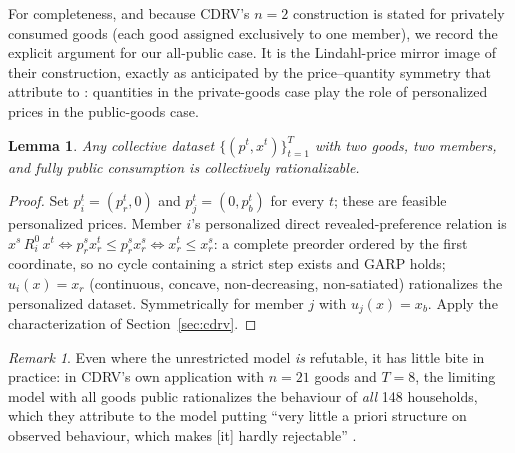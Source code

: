 \documentclass[11pt]{article}
\newtheorem{lemma}{Lemma}
\theoremstyle{remark}
\newtheorem{remark}{Remark}
\begin{document}
For completeness, and because CDRV's $n=2$ construction is stated for privately consumed goods (each good assigned exclusively to one member), we record the explicit argument for our all-public case. It is the Lindahl-price mirror image of their construction, exactly as anticipated by the price--quantity symmetry that \citet[fn.~8]{cherchye2011} attribute to \citet{chiapporiekeland2009}: quantities in the private-goods case play the role of personalized prices in the public-goods case.

\begin{lemma}\label{lem:vacuity}
Any collective dataset $\{(p^t,x^t)\}_{t=1}^{T}$ with two goods, two members, and fully public consumption is collectively rationalizable.
\end{lemma}

\begin{proof}
Set $p^t_i=(p^t_r,0)$ and $p^t_j=(0,p^t_b)$ for every $t$; these are feasible personalized prices. Member $i$'s personalized direct revealed-preference relation is $x^s\,R^0_i\,x^t \iff p^s_r x^t_r\le p^s_r x^s_r \iff x^t_r\le x^s_r$: a complete preorder ordered by the first coordinate, so no cycle containing a strict step exists and GARP holds; $u_i(x)=x_r$ (continuous, concave, non-decreasing, non-satiated) rationalizes the personalized dataset. Symmetrically for member $j$ with $u_j(x)=x_b$. Apply the characterization of Section~\ref{sec:cdrv}.
\end{proof}

\begin{remark}
Even where the unrestricted model \emph{is} refutable, it has little bite in practice: in CDRV's own application with $n=21$ goods and $T=8$, the limiting model with all goods public rationalizes the behaviour of \emph{all} 148 households, which they attribute to the model putting ``very little a priori structure on observed behaviour, which makes [it] hardly rejectable'' \citep[Table~1 and p.~187]{cherchye2011}.
\end{remark}
\end{document}
